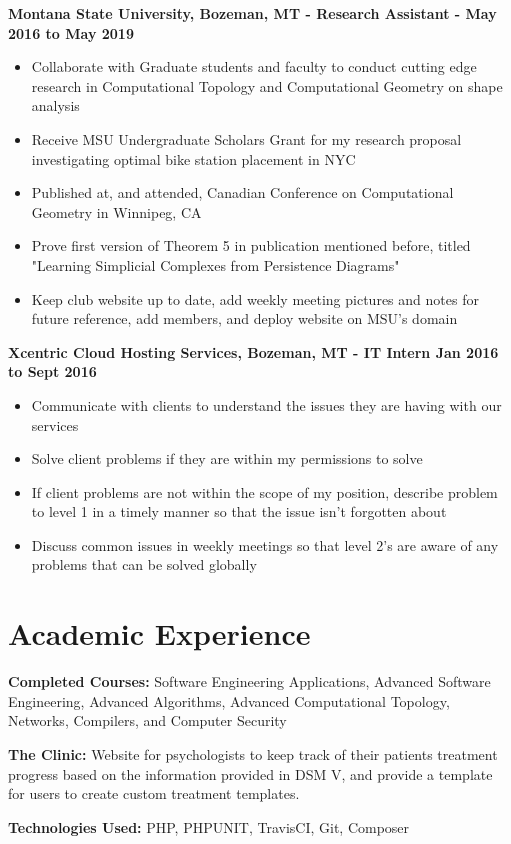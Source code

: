 \documentclass[margin,line]{res}
\begin{document}
\begin{resume}
				{\bf Montana State University, Bozeman, MT - Research Assistant - May 2016 to May 2019} \\
				\begin{itemize}
								\item Collaborate with Graduate students and faculty to conduct cutting edge research in Computational Topology and Computational Geometry on shape analysis
								\item Receive MSU Undergraduate Scholars Grant for my research proposal investigating optimal bike station placement in NYC
								\item Published at, and attended, Canadian Conference on Computational Geometry in Winnipeg, CA
								\item Prove first version of Theorem 5 in publication mentioned before, titled "Learning Simplicial Complexes from Persistence Diagrams"
								\item Keep club website up to date, add weekly meeting pictures and notes for future reference, add members, and deploy website on MSU's domain
				\end{itemize}
				{\bf Xcentric Cloud Hosting Services, Bozeman, MT - IT Intern Jan 2016 to Sept 2016}
				\begin{itemize}
								\item Communicate with clients to understand the issues they are having with our services
								\item Solve client problems if they are within my permissions to solve
								\item If client problems are not within the scope of my position, describe problem to level 1 in a timely manner so that the issue isn't forgotten about
								\item Discuss common issues in weekly meetings so that level 2's are aware of any problems that can be solved globally
				\end{itemize}
				\section{Academic Experience}
				{\bf Completed Courses: }Software Engineering Applications, Advanced Software Engineering, Advanced Algorithms, Advanced Computational Topology, Networks, Compilers, and Computer Security

				{\bf The Clinic: }Website for psychologists to keep track of their patients treatment progress based on the information provided in DSM V, and provide a template for users to create custom treatment templates. 

				{\bf Technologies Used: }PHP, PHPUNIT, TravisCI, Git, Composer
\end{resume}
\end{document}
